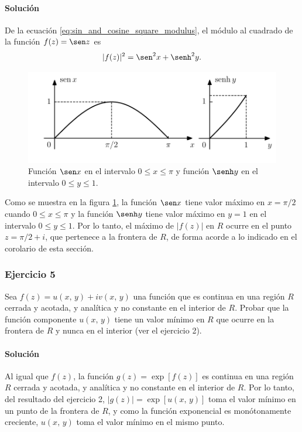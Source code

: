 \documentclass[a4paper]{report}
\begin{document}
\paragraph{Solución} De la ecuación \ref{eq:sin_and_cosine_square_modulus}, el módulo al cuadrado de la función \(f(z)=\sen z\) es
\[
 |f(z)|^2=\sen^2x+\senh^2y.
\]
\begin{figure}[!htb]
  \begin{minipage}[c]{0.7\textwidth}
    \includegraphics[width=\textwidth]{figuras/exercise_59_04_graphs.pdf}
  \end{minipage}\hfill
  \begin{minipage}[c]{0.2\textwidth}
    \caption{
       Función \(\sen x\) en el intervalo  \(0\leq x\leq\pi\) y función \(\senh y\) en el intervalo \(0\leq y\leq1\).
    }\label{fig:exercise_59_04_graphs}
  \end{minipage}
\end{figure}
Como se muestra en la figura \ref{fig:exercise_59_04_graphs}, la función \(\sen x\) tiene valor máximo en \(x=\pi/2\) cuando \(0\leq x\leq\pi\) y la función \(\senh y\) tiene valor máximo en \(y=1\) en el intervalo \(0\leq y\leq1\). Por lo tanto, el máximo de \(|f(z)|\) en \(R\) ocurre en el punto \(z=\pi/2+i\), que pertenece a la frontera de \(R\), de forma acorde a lo indicado en el corolario de esta sección. 

\subsubsection{Ejercicio 5}

Sea \(f(z)=u(x,\,y)+iv(x,\,y)\) una función que es continua en una región \(R\) cerrada y acotada, y analítica y no constante en el interior de \(R\). Probar que la función componente \(u(x,\,y)\) tiene un valor mínimo en \(R\) que ocurre en la frontera de \(R\) y nunca en el interior (ver el ejercicio 2).

\paragraph{Solución} Al igual que \(f(z)\), la función \(g(z)=\exp[f(z)]\) es continua en una región \(R\) cerrada y acotada, y analítica y no constante en el interior de \(R\). Por lo tanto, del resultado del ejercicio 2, \(|g(z)|=\exp[u(x,\,y)]\) toma el valor mínimo en un punto de la frontera de \(R\), y como la función exponencial es monótonamente creciente, \(u(x,\,y)\) toma el valor mínimo en el mismo punto.
\end{document}
